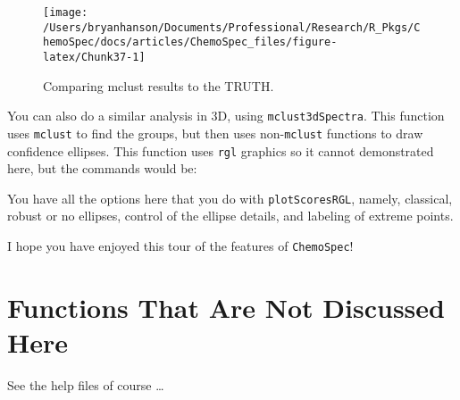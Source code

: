 \documentclass[letter,10pt,twocolumn,twoside,printwatermark=false]{pinp}
\begin{document}
\begin{Shaded}
\begin{Highlighting}[]
\StringTok{ }
   \NormalTok{,}
  \OperatorTok{$}
\end{Highlighting}
\end{Shaded}

\begin{figure}

{\centering \texttt{[image: /Users/bryanhanson/Documents/Professional/Research/R\_Pkgs/ChemoSpec/docs/articles/ChemoSpec\_files/figure-latex/Chunk37-1]} 

}

\caption{\label{mclust3}Comparing mclust results to the TRUTH.}\label{fig:Chunk37}
\end{figure}

You can also do a similar analysis in 3D, using
\texttt{mclust3dSpectra}. This function uses \texttt{mclust} to find the
groups, but then uses non-\texttt{mclust} functions to draw confidence
ellipses. This function uses \texttt{rgl} graphics so it cannot
demonstrated here, but the commands would be:

\begin{Shaded}
\begin{Highlighting}[]
\end{Highlighting}
\end{Shaded}

You have all the options here that you do with \texttt{plotScoresRGL},
namely, classical, robust or no ellipses, control of the ellipse
details, and labeling of extreme points.

I hope you have enjoyed this tour of the features of \texttt{ChemoSpec}!

\hypertarget{functions-that-are-not-discussed-here}{%
\section{Functions That Are Not Discussed
Here}\label{functions-that-are-not-discussed-here}}

See the help files of course \ldots
\end{document}
